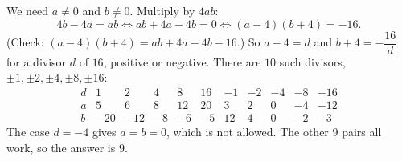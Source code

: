We need $a\ne0$ and $b\ne0$. Multiply by $4ab$:
\[
4b-4a=ab\iff ab+4a-4b=0\iff (a-4)(b+4)=-16 .
\]
(Check: $(a-4)(b+4)=ab+4a-4b-16$.) So $a-4=d$ and $b+4=-\dfrac{16}{d}$ for a divisor $d$ of $16$, positive or negative. There are $10$ such divisors, $\pm1,\pm2,\pm4,\pm8,\pm16$:
\[
\begin{array}{c|cccccccccc}
d&1&2&4&8&16&-1&-2&-4&-8&-16\\\hline
a&5&6&8&12&20&3&2&0&-4&-12\\
b&-20&-12&-8&-6&-5&12&4&0&-2&-3
\end{array}
\]
The case $d=-4$ gives $a=b=0$, which is not allowed. The other $9$ pairs all work, so the answer is $\boxed{9}$.
